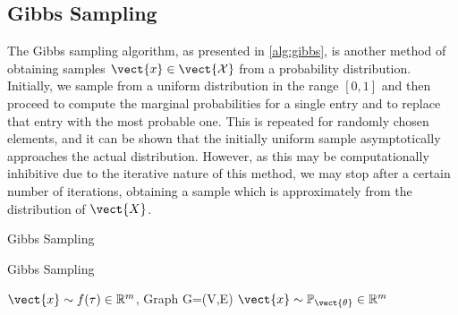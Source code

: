 \subsection{Gibbs Sampling}
The Gibbs sampling algorithm, as presented in \alg\ref{alg:gibbs}, is another method of obtaining samples $\vect{x} \in \vect{\mathcal{X}}$ from a probability distribution. 
Initially, we sample from a uniform distribution in the range $[0,1]$ and then proceed to compute the marginal probabilities for a single entry and to replace that entry with the most probable one.
This is repeated for randomly chosen elements, and it can be shown that the initially uniform sample asymptotically approaches the actual distribution.
However, as this may be computationally inhibitive due to the iterative nature of this method, we may stop after a certain number of iterations, obtaining a sample which is approximately from the distribution of $\vect{X}$.

\begin{algo}{Gibbs Sampling~\cite{yildirim2012bayesian}}
    \begin{algorithm}[H]
        \caption{Gibbs Sampling}
        \begin{algorithmic}[1]
            \label{alg:gibbs}
            \REQUIRE $\vect{x} \sim f(\tau) \in \mathbb{R}^m$, Graph G=(V,E)
            \ENSURE  $\vect{x} \sim \mathbb{P}_{\vect{\theta}}\in \mathbb{R}^m$ \\
                \ENDFOR
            \ENDFOR
        \end{algorithmic}
    \end{algorithm}
\end{algo}
